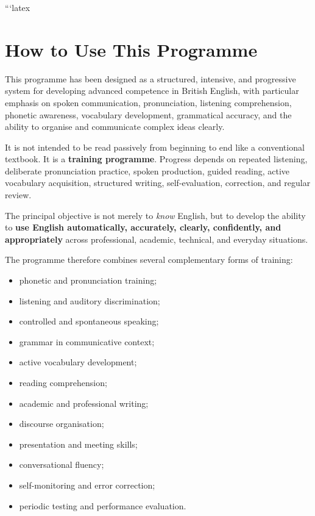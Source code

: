 ```latex

\chapter*{How to Use This Programme}

This programme has been designed as a structured, intensive, and progressive system for developing advanced competence in British English, with particular emphasis on spoken communication, pronunciation, listening comprehension, phonetic awareness, vocabulary development, grammatical accuracy, and the ability to organise and communicate complex ideas clearly.

It is not intended to be read passively from beginning to end like a conventional textbook. It is a \textbf{training programme}. Progress depends on repeated listening, deliberate pronunciation practice, spoken production, guided reading, active vocabulary acquisition, structured writing, self-evaluation, correction, and regular review.

The principal objective is not merely to \emph{know} English, but to develop the ability to \textbf{use English automatically, accurately, clearly, confidently, and appropriately} across professional, academic, technical, and everyday situations.

The programme therefore combines several complementary forms of training:

\begin{itemize}
    \item phonetic and pronunciation training;
    \item listening and auditory discrimination;
    \item controlled and spontaneous speaking;
    \item grammar in communicative context;
    \item active vocabulary development;
    \item reading comprehension;
    \item academic and professional writing;
    \item discourse organisation;
    \item presentation and meeting skills;
    \item conversational fluency;
    \item self-monitoring and error correction;
    \item periodic testing and performance evaluation.
\end{itemize}

